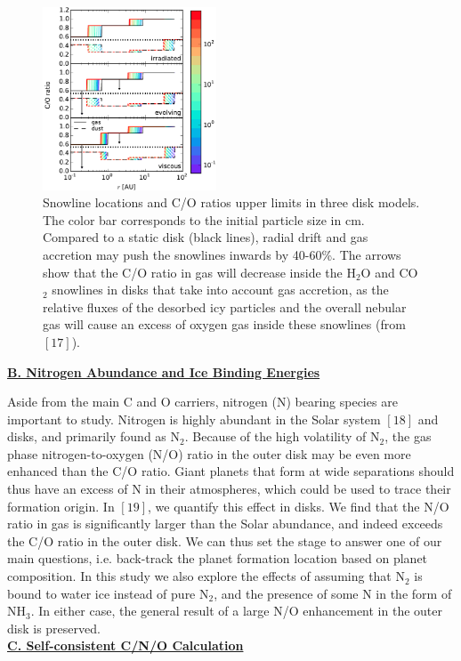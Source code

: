 \documentclass[12pt, letterpaper]{article}
\begin{document}
\begin{figure}
  \begin{center}
    \includegraphics[width=0.46\textwidth]{C_O_ratio_passive_active_disk_many_colorbar_complete_new2}
  \end{center}
  \caption{Snowline locations and C/O ratios upper limits in three disk models. The color bar corresponds to the initial particle size in cm. Compared to a static disk (black lines), radial drift and gas accretion may push the snowlines inwards by 40-60\%. The arrows show that the C/O ratio in gas will decrease inside the H$_2$O and CO$_2$ snowlines in disks that take into account gas accretion, as the relative fluxes of the desorbed icy particles and the overall nebular gas will cause an excess of oxygen gas inside these snowlines (from $[17]$).}
  \vspace{-0.1in}
\end{figure}
\underline{\textbf{B. Nitrogen Abundance and Ice Binding Energies}}

Aside from the main C and O carriers, nitrogen (N) bearing species are important to study. Nitrogen is highly abundant in the Solar system $[18]$ and disks, and primarily found as N$_2$. Because of the high volatility of N$_2$, the gas phase nitrogen-to-oxygen (N/O) ratio in the outer disk may be even more enhanced than the C/O ratio. Giant planets that form at wide separations should thus have an excess of N in their atmospheres, which could be used to trace their formation origin. In $[19]$, we quantify this effect in disks. We find that the N/O ratio in gas is significantly larger than the Solar abundance, and indeed exceeds the C/O ratio in the outer disk. We can thus set the stage to answer one of our main questions, i.e. back-track the planet formation location based on planet composition. In this study we also explore the effects of assuming that N$_2$ is bound to water ice instead of pure N$_2$, and the presence of some N in the form of NH$_3$. In either case, the general result of a large N/O enhancement in the outer disk is preserved. \\
\underline{\textbf{C. Self-consistent C/N/O Calculation}}
\end{document}
